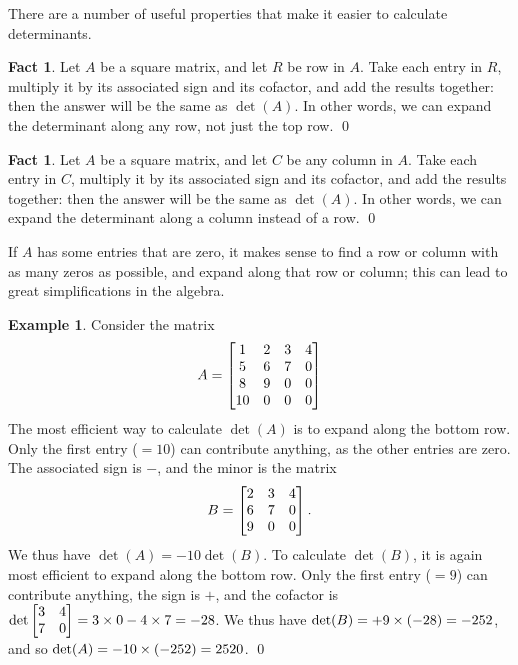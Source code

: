\documentclass[a4paper]{book}
\theoremstyle{definition}
\newtheorem{fact}[theorem]{Fact}
\newtheorem{example}[theorem]{Example}
\begin{document}
There are a number of useful properties that make it easier to
calculate determinants.
\begin{fact}
 Let $A$ be a square matrix, and let $R$ be  row in $A$.
 Take each entry in $R$, multiply it by its associated sign and its
 cofactor, and add the results together: then the answer will be the
 same as $\det(A)$.  In other words, we can expand the determinant
 along any row, not just the top row. \qed
\end{fact}
\begin{fact}
 Let $A$ be a square matrix, and let $C$ be any column in $A$.
 Take each entry in $C$, multiply it by its associated sign and its
 cofactor, and add the results together: then the answer will be the
 same as $\det(A)$.  In other words, we can expand the determinant
 along a column instead of a row. \qed
\end{fact}
If $A$ has some entries that are zero, it makes sense to find a row or
column with as many zeros as possible, and expand along that row or
column; this can lead to great simplifications in the algebra.
\begin{example}
 Consider the matrix
 {\small \[ A=\begin{bmatrix} 1&2&3&4 \\ 5&6&7&0 \\ 8&9&0&0 \\ 10&0&0&0 \end{bmatrix}\]} 
 The most efficient way to calculate $\det(A)$ is to expand along the
 bottom row.  Only the first entry ($=10$) can contribute anything, as
 the other entries are zero.  The associated sign is $-$, and the
 minor is the matrix
 {\small \[ B=\begin{bmatrix} 2&3&4 \\ 6&7&0 \\ 9&0&0 \end{bmatrix}. \]}
 We thus have $\det(A)=-10\det(B)$.  To calculate $\det(B)$, it is
 again most efficient to expand along the bottom row.  Only the first
 entry ($=9$) can contribute anything, the sign is $+$, and the
 cofactor is $\det\begin{bmatrix} 3&4\\7&0\end{bmatrix}=3\times 0-4\times 7=-28$.  We thus have
 $\det(B)=+9\times(-28)=-252$, and so $\det(A)=-10\times(-252)=2520$. 
 \qed
\end{example}
\end{document}
